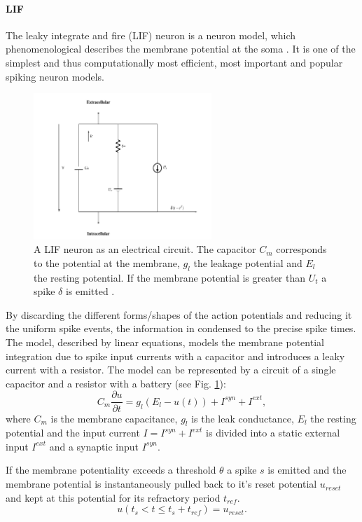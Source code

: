 \paragraph{LIF} \label{c:lif}

The leaky integrate and fire (LIF) neuron is a neuron model, which phenomenological describes the membrane potential at the soma \cite{abbott1999lapicque}\cite{gerstner2014neuronal}\cite{Petrovici2016}. 
It is one of the simplest and thus computationally most efficient, most important and popular spiking neuron models.  

\begin{figure}
	\centering
    	\includegraphics[width=0.6\textwidth]{imgs/lif.png} 
    \caption{A LIF neuron as an electrical circuit. The capacitor $C_m$ corresponds to the potential at the membrane, $g_l$ the leakage potential and $E_l$ the resting potential. If the membrane potential is greater than $U_t$ a spike $\delta$ is emitted \cite{heikoMA}.}
	\label{fig:lif}
\end{figure}

By discarding the different forms/shapes of the action potentials and reducing it the uniform spike events, the information in condensed to the precise spike times.
The model, described by linear equations, models the membrane potential integration due to spike input currents with a capacitor and introduces a leaky current with a resistor. 
The model can be represented by a circuit of a single capacitor and a resistor with a battery (see Fig. \ref{fig:lif}):
\[
C_m \frac{\partial u}{\partial t} = g_l ( E_l - u(t) ) + I^{syn} + I^{ext} , 
\]
where $C_m$ is the membrane capacitance, $g_l$ is the leak conductance, $E_l$ the resting potential and the input current $I = I^{syn} + I^{ext}$ is divided into a static external input $I^{ext}$ and a synaptic input $I^{syn}$.   

If the membrane potentiality exceeds a threshold $\theta$ a spike $s$ is emitted and the membrane potential is instantaneously pulled back to it's reset potential $u_{reset}$ and kept at this potential for its refractory period $t_{ref}$.
\[
u(t_{s} < t \le t_{s} + t_{ref}) = u_{reset}.
\]

